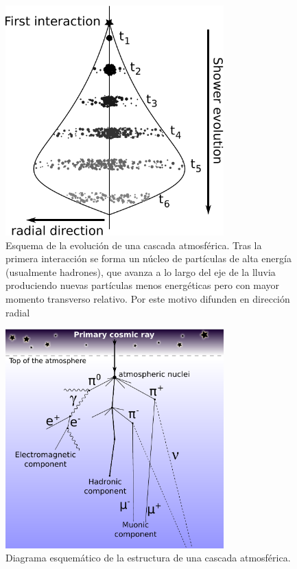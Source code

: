 %
\begin{figure}[ht]
\begin{center}
\includegraphics[width=0.75\textwidth]{fig/EASAuger/lluvia1_english.pdf}
\caption{Esquema de la evolución de una cascada atmosférica. Tras la primera interacción se forma un núcleo de partículas de alta energía (usualmente hadrones), que avanza a lo largo del eje de la lluvia produciendo nuevas partículas menos energéticas pero con mayor momento transverso relativo. Por este motivo difunden en dirección radial}
\label{fig:lluvia1}
\end{center}
\end{figure}
%
%
\begin{figure}[ht]
\begin{center}
\includegraphics[width=0.75\textwidth]{fig/EASAuger/showerSchema_english.pdf}
\caption{Diagrama esquemático de la estructura de una cascada atmosférica.}
\label{fig:showerSchema}
\end{center}
\end{figure}
%


